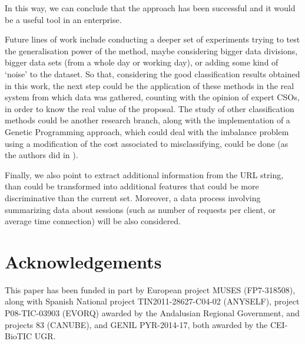 \documentclass{llncs}
\begin{document}
In this way, we can conclude that the approach has been successful and it would be a useful tool in an enterprise.

Future lines of work include conducting a deeper set of experiments trying to test the generalisation power of the method, maybe considering bigger data divisions, bigger data sets (from a whole day or working day), or adding some kind of `noise' to the dataset.
So that, considering the good classification results obtained in this work, the next step could be the application of these methods in the real system from which data was gathered, counting with the opinion of expert CSOs, in order to know the real value of the proposal.
The study of other classification methods could be another research branch, along with the implementation of a Genetic Programming approach, which could deal with the imbalance problem using a modification of the cost associated to misclassifying, could be done (as the authors did in \cite{cost_adjustment_07}).

Finally, we also point to extract additional information from the URL string, than could be transformed into additional features that could be more discriminative than the current set. Moreover, a data process involving summarizing data about sessions (such as number of requests per client, or average time connection) will be also considered.



\section*{Acknowledgements}
This paper has been funded in part by European project MUSES (FP7-318508), along with Spanish National project TIN2011-28627-C04-02 (ANYSELF), project P08-TIC-03903 (EVORQ) awarded by the Andalusian Regional Government, and projects 83 (CANUBE), and GENIL PYR-2014-17, both awarded by the CEI-BioTIC UGR.



\end{document}

